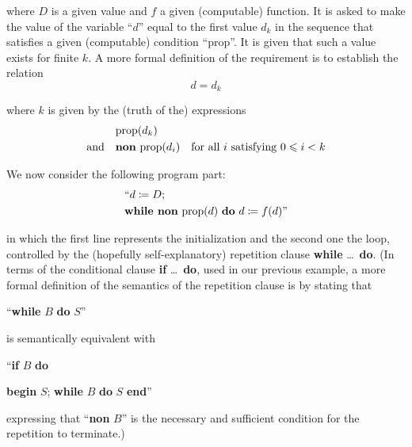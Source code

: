 \noindent
where $D$ is a given value and $f$ a given (computable) function. It is asked to make the value of the variable ``$d$'' equal to the first value $d_k$ in the sequence that satisfies a given (computable) condition ``prop''. It is given that such a value exists for finite $k$. A more formal definition of the requirement is to establish the relation
\begin{equation}
	\label{eq:induction-dk}
	d=d_k
\end{equation}

\noindent
where $k$ is given by the (truth of the) expressions
\begin{align}
	\label{eq:prod-dk}
	&\text{prop}(d_k)& \\
	\label{eq:non-prop-i}
	\text{and}\quad &\text{\textbf{non} prop}(d_i)& \text{for all } i \text{ satisfying } 0 \leqslant i < k
\end{align}

We now consider the following program part:
\begin{equation}
	\label{eq:program-while-non-prop}
	\begin{split}
		&\text{``}d \coloneq D;\\
		&\text{\textbf{while non} prop}(d) \text{ \textbf{do} } d \coloneq f(d)\text{''}
	\end{split}
\end{equation}

\noindent
in which the first line represents the initialization and the second one the loop, controlled by the (hopefully self-explanatory) repetition clause \textbf{while} \dots\ \textbf{do}. (In terms of the conditional clause \textbf{if} \dots\ \textbf{do}, used in our previous example, a more formal definition of the semantics of the repetition clause is by stating
that
\medskip

{
	\setlength{\parindent}{8em}
	\hspace{-.4em}``\textbf{while} $B$ \textbf{do} $S$''
}
\medskip

\noindent
is semantically equivalent with
\medskip

{
	\setlength{\parindent}{8em}
	\hspace{-.4em}``\textbf{if} $B$ \textbf{do}
	
	\quad \textbf{begin} $S$; \textbf{while} $B$ \textbf{do} $S$ \textbf{end}''
}
\medskip

\noindent
expressing that ``\textbf{non} $B$'' is the necessary and sufficient condition for the repetition to terminate.)

